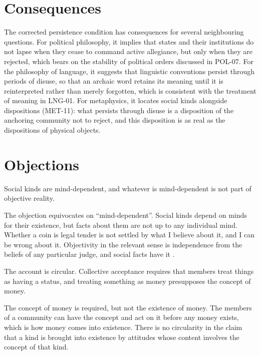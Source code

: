 \documentclass{situationist-preprint}
\begin{document}
\section{Consequences}

The corrected persistence condition has consequences for several neighbouring questions. For political philosophy, it implies that states and their institutions do not lapse when they cease to command active allegiance, but only when they are rejected, which bears on the stability of political orders discussed in POL-07. For the philosophy of language, it suggests that linguistic conventions persist through periods of disuse, so that an archaic word retains its meaning until it is reinterpreted rather than merely forgotten, which is consistent with the treatment of meaning in LNG-01. For metaphysics, it locates social kinds alongside dispositions (MET-11): what persists through disuse is a disposition of the anchoring community not to reject, and this disposition is as real as the dispositions of physical objects.

\section{Objections}

\begin{objection}
Social kinds are mind-dependent, and whatever is mind-dependent is not part of objective reality.
\end{objection}

\begin{reply}
The objection equivocates on \enquote{mind-dependent}. Social kinds depend on minds for their existence, but facts about them are not up to any individual mind. Whether a coin is legal tender is not settled by what I believe about it, and I can be wrong about it. Objectivity in the relevant sense is independence from the beliefs of any particular judge, and social facts have it \citep{Thomasson2003}.
\end{reply}

\begin{objection}
The account is circular. Collective acceptance requires that members treat things as having a status, and treating something as money presupposes the concept of money.
\end{objection}

\begin{reply}
The concept of money is required, but not the existence of money. The members of a community can have the concept and act on it before any money exists, which is how money comes into existence. There is no circularity in the claim that a kind is brought into existence by attitudes whose content involves the concept of that kind.
\end{reply}
\end{document}
